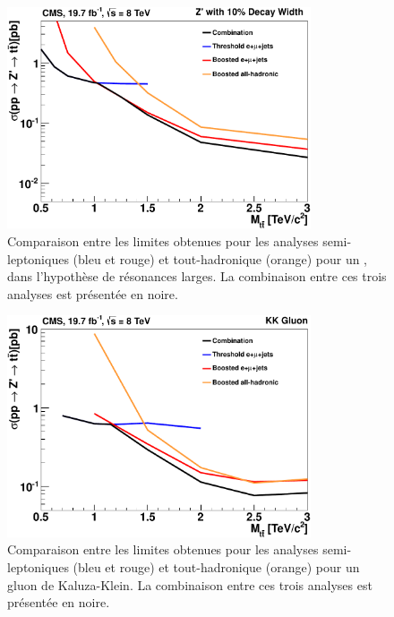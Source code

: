 \begin{figure}[tb]
    \centering
    \includegraphics[width=0.8\textwidth]{chapitre7/figs/limit_comparison_wide_resonances.pdf}
    \caption{Comparaison entre les limites obtenues pour les analyses semi-leptoniques (bleu et rouge) et tout-hadronique (orange) pour un \zprime, dans l'hypothèse de résonances larges. La combinaison entre ces trois analyses est présentée en noire.}
    \label{fig:a1_5}
\end{figure}

\begin{figure}[tb]
    \centering
    \includegraphics[width=0.8\textwidth]{chapitre7/figs/limit_comparison_rsg_resonances.pdf}
    \caption{Comparaison entre les limites obtenues pour les analyses semi-leptoniques (bleu et rouge) et tout-hadronique (orange) pour un gluon de Kaluza-Klein. La combinaison entre ces trois analyses est présentée en noire.}
    \label{fig:a1_6}
\end{figure}